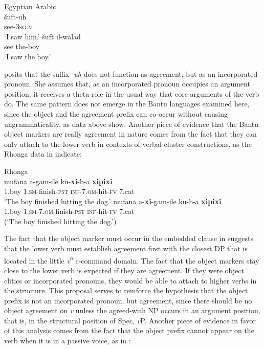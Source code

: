 \documentclass[output=paper]{langsci/langscibook}
\begin{document}
\ea\label{ex:nguna:24}
\ea
{Egyptian Arabic}\\
\gll šuft-uh\\
     see-\textsc{3sg.m}\\
\glt ‘I saw him.’
\ex\label{ex:nguna:}
\gll šuft           il-walad\\
     see           the-boy\\
\glt ‘I saw the boy.’
\z
\z

\citet{Jelinek1989} posits that the suffix -{\textit{uh}} does not function as agreement, but as an incorporated pronoun. She assumes that, as an incorporated pronoun occupies an argument position, it receives {a theta}-role in the usual way that core arguments of the verb do. The same pattern does not emerge in the Bantu languages examined here, since the object and the agreement prefix can co-occur without causing ungrammaticality, as data above show. Another piece of evidence that the Bantu object markers are really agreement in nature comes from the fact that they can only attach to the lower verb in contexts of verbal cluster constructions, as the Rhonga data in  indicate:


\ea\label{ex:nguna:25}
{Rhonga}\\
\ea
\gll mufana         a-gam-ile                ku-\textbf{xi}-b-a                   \textbf{xipixi}\\
     1.boy           1.\textsc{sm}-finish-\textsc{pst}        \textsc{inf}-7.\textsc{om}-hit-\textsc{fv}        7.cat\\
\glt ‘The boy finished hitting the dog.’
\ex\label{ex:nguna:}
\gll *mufana       a-\textbf{xi}-gam-ile                      ku-b-a            \textbf{xipixi}\\
     1.boy           \textsc{1.sm-7.om}-finish-\textsc{pst}         \textsc{inf}-hit-\textsc{fv}      7.cat\\
\glt (‘The boy finished hitting the dog.’)
\z
\z

The fact that the object marker must occur in the embedded clause in  suggests that the lower verb must establish agreement first with the closest DP that is located in the little {\textit{v}}{\textsuperscript{o}} c-command domain. The fact that the object markers stay close to the lower verb is expected if they are agreement. If they were object clitics or incorporated pronouns, they would be able to attach to higher verbs in the structure. This proposal serves to reinforce the hypothesis that the object prefix is not an incorporated pronoun, but agreement, since there should be no object agreement on {\textit{v}} unless the agreed-with NP occurs in an argument position, that is, in the structural position of  Spec, {\textit{v}}P. Another piece of evidence in favor of this analysis comes from the fact that the object prefix cannot appear on the verb when it is in a passive voice, as in :
\end{document}
